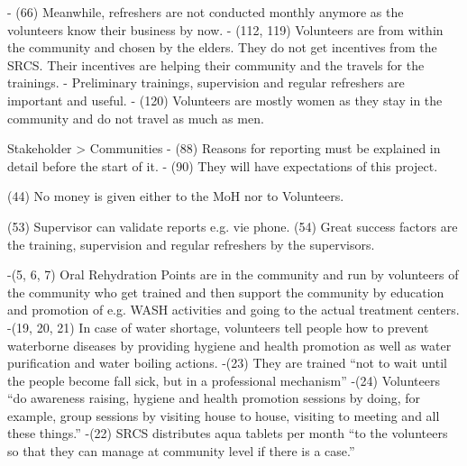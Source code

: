 -	(66) Meanwhile, refreshers are not conducted monthly anymore as the volunteers know their business by now. 
-	(112, 119) Volunteers are from within the community and chosen by the elders. They do not get incentives from the SRCS. Their incentives are helping their community and the travels for the trainings.
-	Preliminary trainings, supervision and regular refreshers are important and useful.
-	(120) Volunteers are mostly women as they stay in the community and do not travel as much as men.

Stakeholder > Communities
-	(88) Reasons for reporting must be explained in detail before the start of it.
-	(90) They will have expectations of this project.

(44) No money is given either to the MoH nor to Volunteers.

(53) Supervisor can validate reports e.g. vie phone.
(54) Great success factors are the training, supervision and regular refreshers by the supervisors.


-(5, 6, 7) Oral Rehydration Points are in the community and run by volunteers of the community who get trained and then support the community by education and promotion of e.g. WASH activities and going to the actual treatment centers.
-(19, 20, 21) In case of water shortage, volunteers tell people how to prevent waterborne diseases by providing hygiene and health promotion as well as water purification and water boiling actions.
-(23) They are trained “not to wait until the people become fall sick, but in a professional mechanism”
-(24) Volunteers “do awareness raising, hygiene and health promotion sessions by doing, for example, group sessions by visiting house to house, visiting to meeting and all these things.”
-(22) SRCS distributes aqua tablets per month “to the volunteers so that they can manage at community level if there is a case.”

